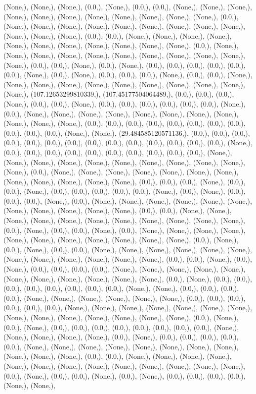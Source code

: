 \documentclass{article}
\begin{document}
(None,), (None,), (None,), (0.0,), (None,), (0.0,), (0.0,), (None,), (None,), (None,), (None,), (None,), (None,), (None,), (None,), (None,), (None,), (None,), (0.0,), (None,), (None,), (None,), (None,), (None,), (None,), (None,), (None,), (None,), (None,), (None,), (None,), (0.0,), (0.0,), (None,), (None,), (None,), (None,), (None,), (None,), (None,), (None,), (None,), (None,), (None,), (0.0,), (None,), (None,), (None,), (None,), (None,), (None,), (None,), (None,), (None,), (None,), (None,), (0.0,), (0.0,), (None,), (0.0,), (None,), (0.0,), (0.0,), (0.0,), (0.0,), (0.0,), (0.0,), (None,), (0.0,), (None,), (0.0,), (0.0,), (0.0,), (None,), (0.0,), (0.0,), (None,), (None,), (None,), (None,), (None,), (None,), (None,), (None,), (None,), (None,), (None,), (107.12653299810339,), (107.45177504064489,), (0.0,), (0.0,), (0.0,), (None,), (0.0,), (0.0,), (None,), (0.0,), (0.0,), (0.0,), (0.0,), (0.0,), (0.0,), (None,), (0.0,), (None,), (None,), (None,), (None,), (None,), (None,), (None,), (None,), (None,), (None,), (None,), (0.0,), (0.0,), (0.0,), (0.0,), (0.0,), (0.0,), (0.0,), (0.0,), (0.0,), (0.0,), (0.0,), (None,), (None,), (29.484585120571136,), (0.0,), (0.0,), (0.0,), (0.0,), (0.0,), (0.0,), (0.0,), (0.0,), (0.0,), (0.0,), (0.0,), (0.0,), (0.0,), (0.0,), (None,), (0.0,), (0.0,), (0.0,), (0.0,), (0.0,), (0.0,), (0.0,), (0.0,), (0.0,), (0.0,), (None,), (None,), (None,), (None,), (None,), (None,), (None,), (None,), (None,), (None,), (None,), (0.0,), (None,), (None,), (None,), (None,), (None,), (None,), (None,), (None,), (None,), (None,), (None,), (None,), (0.0,), (0.0,), (0.0,), (None,), (0.0,), (0.0,), (None,), (0.0,), (0.0,), (0.0,), (0.0,), (0.0,), (None,), (0.0,), (None,), (0.0,), (0.0,), (0.0,), (None,), (0.0,), (None,), (None,), (None,), (None,), (None,), (None,), (None,), (None,), (None,), (None,), (None,), (0.0,), (0.0,), (None,), (None,), (None,), (None,), (None,), (None,), (None,), (None,), (None,), (None,), (None,), (0.0,), (None,), (0.0,), (0.0,), (None,), (0.0,), (None,), (None,), (None,), (None,), (None,), (None,), (None,), (None,), (None,), (None,), (None,), (0.0,), (None,), (0.0,), (None,), (0.0,), (0.0,), (None,), (None,), (None,), (None,), (None,), (None,), (None,), (None,), (None,), (None,), (None,), (None,), (0.0,), (0.0,), (None,), (0.0,), (None,), (0.0,), (0.0,), (0.0,), (0.0,), (None,), (None,), (None,), (None,), (None,), (None,), (None,), (None,), (None,), (None,), (None,), (0.0,), (None,), (0.0,), (0.0,), (0.0,), (0.0,), (0.0,), (0.0,), (0.0,), (0.0,), (None,), (None,), (0.0,), (0.0,), (0.0,), (0.0,), (None,), (None,), (None,), (None,), (None,), (None,), (0.0,), (0.0,), (0.0,), (0.0,), (0.0,), (0.0,), (None,), (None,), (None,), (None,), (None,), (None,), (None,), (None,), (None,), (None,), (None,), (None,), (None,), (None,), (0.0,), (None,), (0.0,), (None,), (0.0,), (0.0,), (0.0,), (0.0,), (0.0,), (0.0,), (0.0,), (0.0,), (None,), (None,), (None,), (None,), (None,), (0.0,), (None,), (0.0,), (0.0,), (0.0,), (0.0,), (0.0,), (None,), (None,), (None,), (None,), (None,), (None,), (None,), (None,), (None,), (None,), (None,), (0.0,), (0.0,), (None,), (None,), (None,), (None,), (None,), (None,), (None,), (None,), (None,), (None,), (None,), (None,), (None,), (0.0,), (None,), (0.0,), (0.0,), (None,), (0.0,), (None,), (0.0,), (0.0,), (0.0,), (0.0,), (None,), (None,), 
\end{document}
